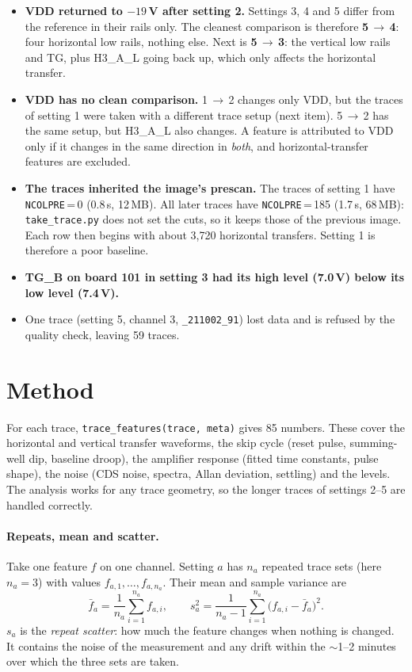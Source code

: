 \documentclass[10pt]{article}
\newcommand{\code}[1]{\texttt{#1}}
\begin{document}
\begin{itemize}
\item \textbf{VDD returned to $-19$\,V after setting 2.} Settings 3, 4 and 5 differ from the reference in their rails only.
  The cleanest comparison is therefore \textbf{5\,$\to$\,4}: four horizontal low rails, nothing else. Next is
  \textbf{5\,$\to$\,3}: the vertical low rails and TG, plus H3\_A\_L going back up, which only affects the horizontal transfer.
\item \textbf{VDD has no clean comparison.} 1\,$\to$\,2 changes only VDD, but the traces of setting 1 were taken with a
  different trace setup (next item). 5\,$\to$\,2 has the same setup, but H3\_A\_L also changes. A feature is attributed to VDD
  only if it changes in the same direction in \emph{both}, and horizontal-transfer features are excluded.
\item \textbf{The traces inherited the image's prescan.} The traces of setting 1 have \code{NCOLPRE}\,=\,0 (0.8\,s, 12\,MB). All
  later traces have \code{NCOLPRE}\,=\,185 (1.7\,s, 68\,MB): \code{take\_trace.py} does not set the cuts, so it keeps those of
  the previous image. Each row then begins with about 3,720 horizontal transfers. Setting 1 is therefore a poor baseline.
\item \textbf{TG\_B on board 101 in setting 3 had its high level (7.0\,V) below its low level (7.4\,V).}
\item One trace (setting 5, channel 3, \code{\_211002\_91}) lost data and is refused by the quality check, leaving 59 traces.
\end{itemize}

\section{Method}

For each trace, \code{trace\_features(trace, meta)} gives 85 numbers. These cover the horizontal and vertical transfer
waveforms, the skip cycle (reset pulse, summing-well dip, baseline droop), the amplifier response (fitted time constants,
pulse shape), the noise (CDS noise, spectra, Allan deviation, settling) and the levels. The analysis works for any trace
geometry, so the longer traces of settings 2--5 are handled correctly.

\paragraph{Repeats, mean and scatter.} Take one feature $f$ on one channel. Setting $a$ has $n_a$ repeated trace sets
(here $n_a = 3$) with values $f_{a,1},\dots,f_{a,n_a}$. Their mean and sample variance are
\begin{equation}
\bar f_a = \frac{1}{n_a}\sum_{i=1}^{n_a} f_{a,i}, \qquad
s_a^2 = \frac{1}{n_a-1}\sum_{i=1}^{n_a} \bigl(f_{a,i}-\bar f_a\bigr)^2 .
\end{equation}
$s_a$ is the \emph{repeat scatter}: how much the feature changes when nothing is changed. It contains the noise of the
measurement and any drift within the $\sim$1--2 minutes over which the three sets are taken.
\end{document}
